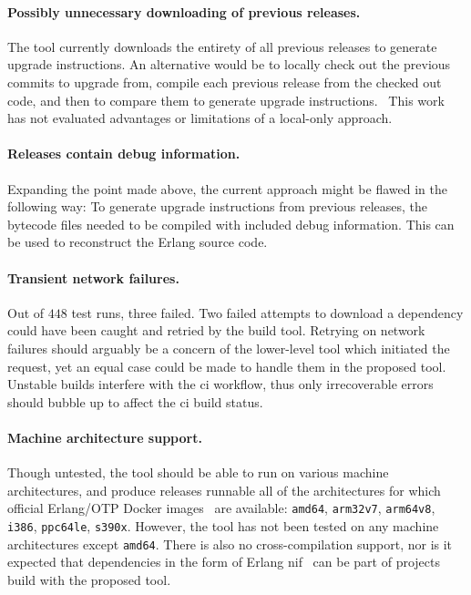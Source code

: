 \paragraph{Possibly unnecessary downloading of previous releases.} The tool currently downloads the entirety of all previous releases to generate upgrade instructions. An alternative would be to locally check out the previous commits to upgrade from, compile each previous release from the checked out code, and then to compare them to generate upgrade instructions.~\cite{rebar3appup} This work has not evaluated advantages or limitations of a local-only approach.

\paragraph{Releases contain debug information.} Expanding the point made above, the current approach might be flawed in the following way: To generate upgrade instructions from previous releases, the bytecode files needed to be compiled with included debug information. This can be used to reconstruct the Erlang source code.~\cite{doc:otp}

\paragraph{Transient network failures.} Out of $448$ test runs, three failed. Two failed attempts to download a dependency could have been caught and retried by the build tool. Retrying on network failures should arguably be a concern of the lower-level tool which initiated the request, yet an equal case could be made to handle them in the proposed tool. Unstable builds interfere with the \acrshort{ci} workflow, thus only irrecoverable errors should bubble up to affect the \acrshort{ci} build status.

\paragraph{Machine architecture support.} Though untested, the tool should be able to run on various machine architectures, and produce releases runnable all of the architectures for which official Erlang/OTP Docker images~\cite{docker:erlang} are available: \lstinline|amd64|, \lstinline|arm32v7|, \lstinline|arm64v8|, \lstinline|i386|, \lstinline|ppc64le|, \lstinline|s390x|. However, the tool has not been tested on any machine architectures except \lstinline|amd64|. There is also no cross-compilation support, nor is it expected that dependencies in the form of Erlang \acrfull{nif}~\cite{doc:otp} can be part of projects build with the proposed tool.


